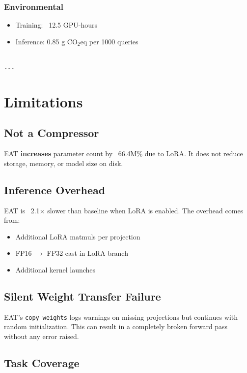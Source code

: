 \subsubsection{Environmental}
\begin{itemize}
\item Training: ~12.5 GPU-hours
\item Inference: 0.85 g CO$_2$eq per 1000 queries
\end{itemize}
\begin{lstlisting}

---
\end{lstlisting}


\section{Limitations}

\subsection{Not a Compressor}

EAT \textbf{increases} parameter count by ~66.4M\% due to LoRA. It 
does not reduce storage, memory, or model size on disk.

\subsection{Inference Overhead}

EAT is ~2.1$\times$ slower than baseline when LoRA is enabled. 
The overhead comes from:

\begin{itemize}
\item Additional LoRA matmuls per projection
\item FP16 $\to$ FP32 cast in LoRA branch
\item Additional kernel launches

\end{itemize}
\subsection{Silent Weight Transfer Failure}

EAT's \texttt{copy\_weights} logs warnings on missing projections but continues 
with random initialization. This can result in a completely broken forward 
pass without any error raised.

\subsection{Task Coverage}

